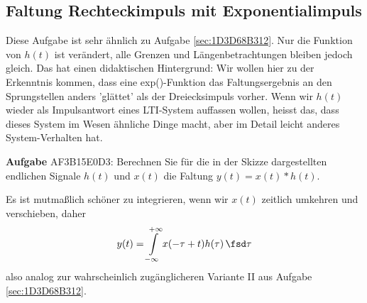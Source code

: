 \clearpage
\subsection{Faltung Rechteckimpuls mit Exponentialimpuls}
\label{sec:AF3B15E0D3}
\begin{Ziel}
Diese Aufgabe ist sehr ähnlich zu Aufgabe \ref{sec:1D3D68B312}.
Nur die Funktion von $h(t)$ ist verändert, alle Grenzen und
Längenbetrachtungen bleiben jedoch gleich. Das hat einen didaktischen
Hintergrund: Wir wollen hier zu der Erkenntnis kommen, dass eine exp()-Funktion
das Faltungsergebnis an den Sprungstellen anders 'glättet' als der Dreiecksimpuls
vorher.
Wenn wir $h(t)$ wieder als Impulsantwort eines LTI-System auffassen wollen,
heisst das, dass dieses System im Wesen ähnliche Dinge macht, aber im Detail
leicht anderes System-Verhalten hat.
\end{Ziel}
\textbf{Aufgabe} {\tiny AF3B15E0D3}: Berechnen Sie für die in der Skizze dargestellten
endlichen Signale $h(t)$ und $x(t)$ die Faltung $y(t)=x(t) \ast h(t)$.




\begin{Werkzeug}
Es ist mutmaßlich schöner zu integrieren, wenn wir $x(t)$ zeitlich umkehren und
verschieben, daher
\begin{equation}
y(t) = \int\limits_{-\infty}^{+\infty} x(-\tau+t) h(\tau) \, \fsd \tau
\end{equation}
also analog zur wahrscheinlich zugänglicheren Variante II aus Aufgabe
\ref{sec:1D3D68B312}.
\end{Werkzeug}


